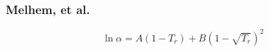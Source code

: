 \subsubsection{Melhem, et al.\cite{melhem}}

\begin{equation}
\ln{\alpha}=A\left(1-T_r\right)+ B\left(1-\sqrt{T_r}\right)^2
\end{equation}